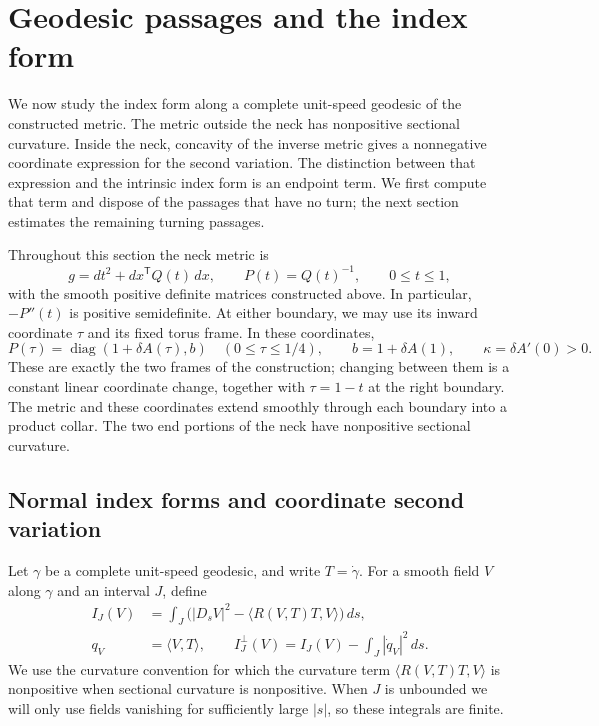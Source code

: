 \section{Geodesic passages and the index form}\label{sec:variations}

We now study the index form along a complete unit-speed geodesic of the
constructed metric.  The metric outside the neck has nonpositive sectional
curvature.  Inside the neck, concavity of the inverse metric gives a nonnegative
coordinate expression for the second variation.  The distinction between
that expression and the intrinsic index form is an endpoint term.  We first
compute that term and dispose of the passages that have no turn; the next
section estimates the remaining turning passages.

Throughout this section the neck metric is
\[
 g=dt^2+dx^{\mathsf T}Q(t)\,dx,\qquad P(t)=Q(t)^{-1},\qquad 0\le t\le1,
\]
with the smooth positive definite matrices constructed above.  In particular,
$-P''(t)$ is positive semidefinite.  At either boundary, we may use its inward
coordinate $\tau$ and its fixed torus frame.  In these coordinates,
\begin{equation}\label{eq:variational-end-germ}
 P(\tau)=\operatorname{diag}(1+\delta A(\tau),b)
 \quad(0\le\tau\le1/4),\qquad
 b=1+\delta A(1),\qquad \kappa=\delta A'(0)>0.
\end{equation}
These are exactly the two frames of the construction; changing between them
is a constant linear coordinate change, together with $\tau=1-t$ at the
right boundary.  The metric and these coordinates extend smoothly through
each boundary into a product collar.  The two end portions of the neck have
nonpositive sectional curvature.

\subsection{Normal index forms and coordinate second variation}

Let $\gamma$ be a complete unit-speed geodesic, and write $T=\dot\gamma$.
For a smooth field $V$ along $\gamma$ and an interval $J$, define
\begin{align}
 I_J(V)&=\int_J\bigl(|D_sV|^2-
       \langle R(V,T)T,V\rangle\bigr)\,ds,\label{eq:index-definition}\\
 q_V&=\langle V,T\rangle,\qquad
 I_J^\perp(V)=I_J(V)-\int_J|\dot q_V|^2\,ds.
       \label{eq:normal-index-definition}
\end{align}
We use the curvature convention for which the curvature term
$\langle R(V,T)T,V\rangle$ is nonpositive when sectional curvature is
nonpositive.  When $J$ is unbounded we will only use fields vanishing for
sufficiently large $|s|$, so these integrals are finite.

